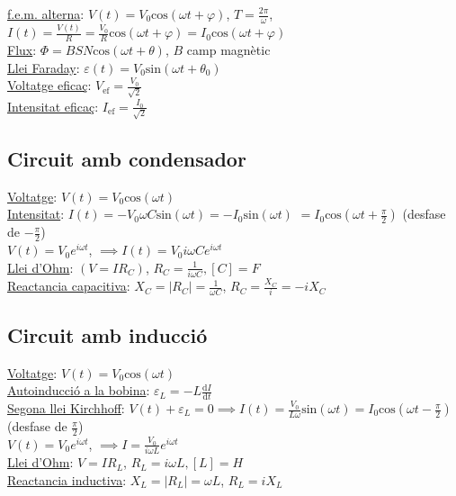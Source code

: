 \documentclass[10pt]{article}
\begin{document}
\begin{multicols}{5}
\underline{f.e.m. alterna}: $V(t) = V_0\text{cos}(\omega t+\varphi)$, $T = \frac{2\pi}{\omega}$, $I(t) = \frac{V(t)}{R} = \frac{V_0}{R}\text{cos}(\omega t + \varphi) = I_0\text{cos}(\omega t + \varphi)$ \\
\underline{Flux}: $\Phi = BSN\text{cos}(\omega t+\theta)$, $B$ camp magnètic \\
\underline{Llei Faraday}: $\varepsilon(t) = V_0\text{sin}(\omega t + \theta_0)$ \\
\underline{Voltatge eficaç}: $V_{\text{ef}} = \frac{V_0}{\sqrt{2}}$ \\
\underline{Intensitat eficaç}: $I_{\text{ef}} = \frac{I_0}{\sqrt{2}}$

\subsection{Circuit amb condensador}

\underline{Voltatge}: $V(t) = V_0\text{cos}(\omega t)$ \\
\underline{Intensitat}: $I(t) = -V_0\omega C \text{sin}(\omega t) = -I_0\text{sin}(\omega t)$ $= I_0\text{cos}(\omega t + \frac{\pi}{2})$ (desfase de $-\frac{\pi}{2}$) \\
$V(t) = V_0 e^{i\omega t}$, $\implies I(t) = V_0i\omega Ce^{i\omega t}$ \\
\underline{Llei d'Ohm}: $(V=IR_C)$, $R_C = \frac{1}{i\omega C}, [C] = F$ \\
\underline{Reactancia capacitiva}: $X_C = \vert R_C\vert = \frac{1}{\omega C}$, $R_C = \frac{X_C}{i} = -iX_C$

\subsection{Circuit amb inducció}

\underline{Voltatge}: $V(t) = V_0\text{cos}(\omega t)$ \\
\underline{Autoinducció a la bobina}: $\varepsilon_L = -L \frac{\text{d}I}{\text{d}t}$ \\
\underline{Segona llei Kirchhoff}: $V(t) + \varepsilon_L = 0 \implies I(t) = \frac{V_0}{L\omega}\text{sin}(\omega t) = I_0\text{cos}(\omega t - \frac{\pi}{2})$ (desfase de $\frac{\pi}{2}$) \\
$V(t) = V_0e^{i\omega t}$, $\implies I = \frac{V_0}{i\omega L}e^{i\omega t}$ \\
\underline{Llei d'Ohm}: $V=IR_L$, $R_L=i\omega L, [L] = H$ \\
\underline{Reactancia inductiva}: $X_L = \vert R_L\vert = \omega L$, $R_L = iX_L$


\end{multicols}
\end{document}
